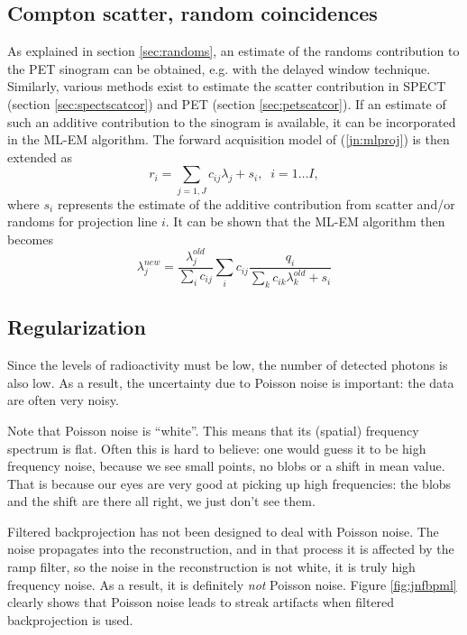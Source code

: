 \documentclass[11pt,oneside]{book}
\begin{document}
\subsection{Compton scatter, random coincidences}
As explained in section \ref{sec:randoms}, an estimate of the randoms
contribution to the PET sinogram can be obtained, e.g. with the
delayed window technique. Similarly, various methods exist to estimate
the scatter contribution in SPECT (section \ref{sec:spectscatcor})
and PET (section \ref{sec:petscatcor}). If an estimate of such an
additive contribution to the sinogram is available, it can be
incorporated in the ML-EM algorithm. The forward acquisition model
of (\ref{jn:mlproj}) is then extended as 
\begin{equation}
  r_i = \sum_{j=1,J} c_{ij} \lambda_j + s_i, \;\; i = 1 \ldots I,
  \label{jn:mlprojscat}
\end{equation}
where $s_i$ represents the estimate of the additive contribution from
scatter and/or randoms for projection line $i$. It can be shown that
the ML-EM algorithm then becomes
\begin{equation}
  \lambda_j^{new}  =  \frac{\lambda_j^{old}}{\sum_i c_{ij}}
           \sum_i c_{ij}  \frac{q_i}{\sum_k c_{ik} \lambda_k^{old} + s_i}
           \label{eq:jnmlemscat}
\end{equation}



\subsection{Regularization} \label{sec:regularization}
Since the levels of radioactivity must be low, the number of detected photons
is also low. As a result, the uncertainty due to Poisson noise is important:
the data are often very noisy. 

Note that Poisson noise is ``white''. This means that its (spatial) frequency
spectrum is flat. Often this is hard to believe: one would guess it to be high
frequency noise, because we see small points, no blobs or a shift in mean
value.  That is because our eyes are very good at picking up high frequencies:
the blobs and the shift are there all right, we just don't see them.

Filtered backprojection has not been designed to deal with Poisson
noise. The noise propagates into the reconstruction, and in that
process it is affected by the ramp filter, so the noise in the
reconstruction is not white, it is truly high frequency noise. As a
result, it is definitely {\em not} Poisson noise. Figure
\ref{fig:jnfbpml} clearly shows that Poisson noise leads to streak
artifacts when filtered backprojection is used.
\end{document}

